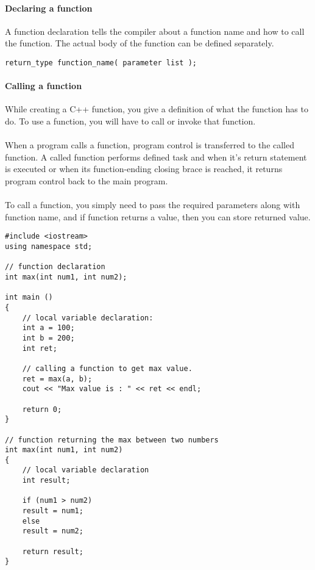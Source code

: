 \documentclass[11pt,fleqn]{book} %
\begin{document}
\paragraph{Declaring a function}
A function declaration tells the compiler about a function name and how to call the function. The actual body of the function can be defined separately.\\
\begin{lstlisting}
return_type function_name( parameter list );
\end{lstlisting}
\newpage
\paragraph{Calling a function}
While creating a C++ function, you give a definition of what the function has to do. To use a function, you will have to call or invoke that function. \\ ~\\
When a program calls a function, program control is transferred to the called function. A called function performs defined task and when it’s return statement is executed or when its function-ending closing brace is reached, it returns program control back to the main program. \\ ~\\
To call a function, you simply need to pass the required parameters along with function name, and if function returns a value, then you can store returned value.
\begin{example}
	\begin{lstlisting}[title={Declaration, definition amd calling of a max function},captionpos=b]
#include <iostream>
using namespace std;
	
// function declaration
int max(int num1, int num2);
	
int main () 
{
	// local variable declaration:
	int a = 100;
	int b = 200;
	int ret;
	
	// calling a function to get max value.
	ret = max(a, b);
	cout << "Max value is : " << ret << endl;
	
	return 0;
}
	
// function returning the max between two numbers
int max(int num1, int num2) 
{
	// local variable declaration
	int result;
	
	if (num1 > num2)
	result = num1;
	else
	result = num2;
	
	return result; 
}
	\end{lstlisting}
\end{example}
\newpage
\end{document}
